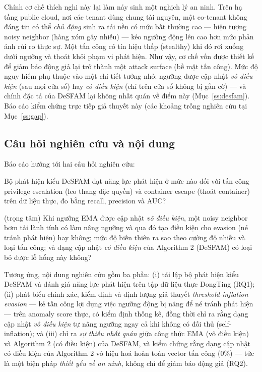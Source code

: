 Chính cơ chế thích nghi này lại làm nảy sinh một nghịch lý an ninh. Trên hạ tầng public cloud, nơi các tenant dùng chung tài nguyên, một co-tenant không đáng tin có thể \textit{chủ động} sinh ra tải nền có mức bất thường cao — hiện tượng noisy neighbor (hàng xóm gây nhiễu) — kéo ngưỡng động lên cao hơn mức phản ánh rủi ro thực sự. Một tấn công có tín hiệu thấp (stealthy) khi đó rơi xuống dưới ngưỡng và thoát khỏi phạm vi phát hiện. Như vậy, cơ chế vốn được thiết kế để giảm báo động giả lại trở thành một attack surface (bề mặt tấn công). Mức độ nguy hiểm phụ thuộc vào một chi tiết tưởng nhỏ: ngưỡng được cập nhật \textit{vô điều kiện} (sau mọi cửa sổ) hay \textit{có điều kiện} (chỉ trên cửa sổ không bị gắn cờ) — và chính đặc tả của DeSFAM lại không nhất quán về điểm này (Mục~\ref{ss:desfam}). Báo cáo kiểm chứng trực tiếp giả thuyết này (các khoảng trống nghiên cứu tại Mục~\ref{ss:gap}).

\subsection{Câu hỏi nghiên cứu và nội dung}
Báo cáo hướng tới hai câu hỏi nghiên cứu:
\begin{description}[leftmargin=1.4cm,style=nextline]
\item[RQ1] Bộ phát hiện kiểu DeSFAM đạt năng lực phát hiện ở mức nào đối với tấn công privilege escalation (leo thang đặc quyền) và container escape (thoát container) trên dữ liệu thực, đo bằng recall, precision và AUC?
\item[RQ2] (trọng tâm) Khi ngưỡng EMA được cập nhật \textit{vô điều kiện}, một noisy neighbor bơm tải lành tính có làm nâng ngưỡng và qua đó tạo điều kiện cho evasion (né tránh phát hiện) hay không; mức độ biến thiên ra sao theo cường độ nhiễu và loại tấn công; và dạng cập nhật \textit{có điều kiện} của Algorithm 2 (DeSFAM) có loại bỏ được lỗ hổng này không?
\end{description}

Tương ứng, nội dung nghiên cứu gồm ba phần: (i) tái lập bộ phát hiện kiểu DeSFAM và đánh giá năng lực phát hiện trên tập dữ liệu thực DongTing (RQ1); (ii) phát biểu chính xác, kiểm định và định lượng giả thuyết \textit{threshold-inflation evasion} — kẻ tấn công lợi dụng việc ngưỡng động bị nâng để né tránh phát hiện — trên anomaly score thực, có kiểm định thống kê, đồng thời chỉ ra rằng dạng cập nhật \textit{vô điều kiện} tự nâng ngưỡng ngay cả khi không có đối thủ (self-inflation); và (iii) chỉ ra \textit{sự thiếu nhất quán} giữa công thức EMA (vô điều kiện) và Algorithm 2 (có điều kiện) của DeSFAM, và kiểm chứng rằng dạng cập nhật có điều kiện của Algorithm 2 vô hiệu hoá hoàn toàn vector tấn công ($0\%$) — tức là một biện pháp \textit{thiết yếu về an ninh}, không chỉ để giảm báo động giả (RQ2).

